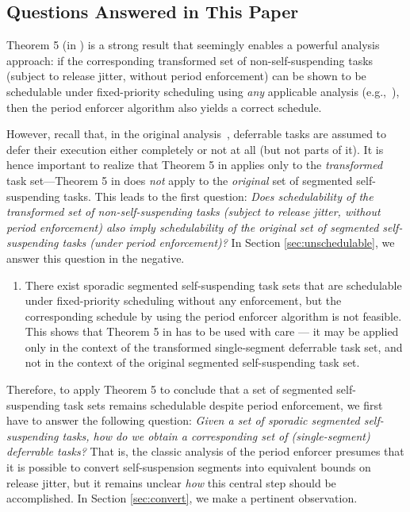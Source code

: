 \subsection{Questions Answered in This Paper}
\label{sec:questions}

Theorem 5 (in \cite{Raj:suspension1991}) is a strong result that seemingly enables a powerful analysis approach: if the corresponding transformed set of non-self-suspending tasks (subject to release jitter, without period enforcement) can be shown to be schedulable under fixed-priority scheduling using \emph{any} applicable analysis (e.g.,~\cite{ABRTW:93}), then the period enforcer algorithm also yields a correct schedule.

However, recall that, in the original analysis~\cite{Raj:suspension1991}, deferrable tasks are assumed to defer their  execution either completely or not at all (but not parts of it). It is hence important to realize that Theorem 5 in \cite{Raj:suspension1991} applies only to the \emph{transformed} task set---Theorem 5 in \cite{Raj:suspension1991} does \emph{not} apply to the \emph{original} set of segmented self-suspending tasks. This leads to the first question: \emph{Does schedulability of the transformed set of non-self-suspending tasks (subject to release jitter, without period enforcement) also imply schedulability of the original set of segmented self-suspending tasks (under period enforcement)?}  In Section \ref{sec:unschedulable}, we answer this question in the negative.

\begin{enumerate}
	\item There exist sporadic segmented self-suspending task sets that are schedulable under fixed-priority scheduling without any enforcement, but the corresponding schedule by using the period enforcer algorithm is not feasible. This shows that Theorem 5 in \cite{Raj:suspension1991} has to be  used with care --- it may be applied only in the context of the transformed single-segment deferrable task set, and not in the context of the original segmented self-suspending task set.
\end{enumerate}


Therefore, to apply Theorem 5 to conclude that a set of segmented self-suspending task sets remains schedulable despite period enforcement, we first have to answer the following question: \emph{Given a set of sporadic segmented self-suspending tasks, how do we obtain a corresponding set of (single-segment) deferrable tasks?} That is, the classic analysis of the period enforcer \cite{Raj:suspension1991} presumes that it is possible to convert self-suspension segments into equivalent bounds on release jitter, but it remains unclear \emph{how} this central step should be accomplished. In Section \ref{sec:convert}, we make a pertinent observation.

